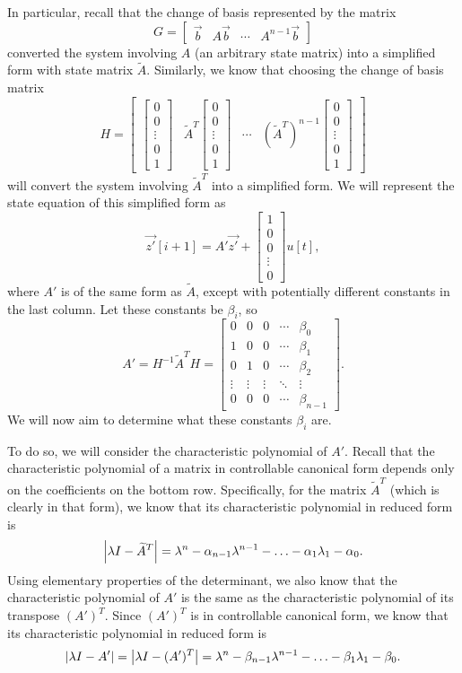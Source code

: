 \documentclass[letterpaper]{article}
\theoremstyle{remark}
\renewcommand{\tilde}[1]{\widetilde{#1}}
\newcommand{\mat}[1]{\ensuremath{\begin{bmatrix}#1\end{bmatrix}}}
\begin{document}
In particular, recall that the change of basis represented by the matrix
\[
    G = \mat{\vec{b} & A\vec{b} & \cdots & A^{n-1}\vec{b}}
\]
converted the system involving $A$ (an arbitrary state matrix) into a simplified form with state matrix $\tilde{A}$. Similarly, we know that choosing the change of basis matrix
\[
    H = \mat{ \mat{0 \\ 0 \\ \vdots \\ 0 \\ 1} & \tilde{A}^T \mat{0 \\ 0 \\ \vdots \\ 0 \\ 1} & \cdots & (\tilde{A}^T)^{n-1} \mat{0 \\ 0 \\ \vdots \\ 0 \\ 1}}
\]
will convert the system involving $\tilde{A}^T$ into a simplified form. We will represent the state equation of this simplified form as
\[
    \vec{z'}[i+1] = A'\vec{z'} + \mat{1 \\ 0 \\ 0 \\ \vdots \\ 0}u[t],
\]
where $A'$ is of the same form as $\tilde{A}$, except with potentially different constants in the last column. Let these constants be $\beta_i$, so
\[
    A' = H^{-1}\tilde{A}^TH = 
    \mat{
    0 & 0 & 0 & \cdots & \beta_0 \\
    1 & 0 & 0 & \cdots & \beta_1 \\
    0 & 1 & 0 & \cdots & \beta_2 \\
    \vdots & \vdots & \vdots & \ddots & \vdots \\
    0 & 0 & 0 & \cdots & \beta_{n-1}
    }.
\]
We will now aim to determine what these constants $\beta_i$ are. 

To do so, we will consider the characteristic polynomial of $A'$. Recall that the characteristic polynomial of a matrix in controllable canonical form depends only on the coefficients on the bottom row. Specifically, for the matrix $\tilde{A}^T$ (which is clearly in that form), we know that its characteristic polynomial in reduced form is
\[
    \abs{\lambda I - \tilde{A}^T} = \lambda^n - \alpha_{n-1}\lambda^{n-1} - \ldots - \alpha_1\lambda_1 - \alpha_0.
\]
Using elementary properties of the determinant, we also know that the characteristic polynomial of $A'$ is the same as the characteristic polynomial of its transpose $(A')^T$. Since $(A')^T$ is in controllable canonical form, we know that its characteristic polynomial in reduced form is
\[
    \abs{\lambda I - A'} = \abs{\lambda I - (A')^T} = \lambda^n - \beta_{n-1}\lambda^{n-1} - \ldots - \beta_1\lambda_1 - \beta_0.
\]
\end{document}
